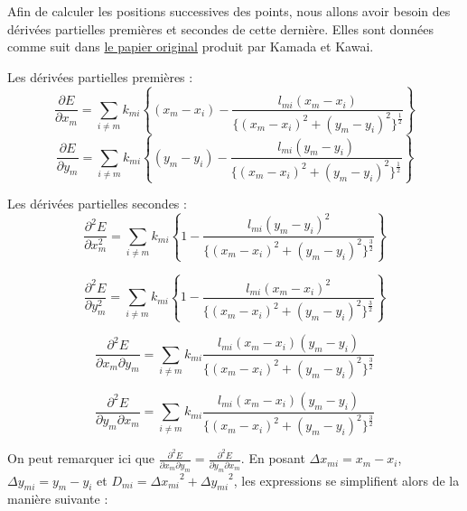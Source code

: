 \documentclass[a4paper,12pt]{article}
\begin{document}
Afin de calculer les positions successives des points, nous allons avoir besoin des dérivées partielles premières et secondes de cette dernière. Elles sont données comme suit dans \href{http://vis.pku.edu.cn/course/Visualization_2018F/reading/drawing_general_undirected.pdf}{le papier original} produit par Kamada et Kawai.

Les dérivées partielles premières :
\begin{equation}
\frac{\partial E}{\partial x_m} = \sum_{i \ne m} k_{mi} \left\{ (x_m - x_i) - \frac {l_{mi}(x_m - x_i)}{\{ (x_m - x_i)^2 + (y_m - y_i)^2 \}^{\frac{1}{2}}} \right\}
\end{equation}
\begin{equation}
\frac{\partial E}{\partial y_m} = \sum_{i \ne m} k_{mi} \left\{ (y_m - y_i) - \frac {l_{mi}(y_m - y_i)}{\{ (x_m - x_i)^2 + (y_m - y_i)^2 \}^{\frac{1}{2}}} \right\}
\end{equation}

Les dérivées partielles secondes :
\begin{equation}
\frac{\partial^2 E}{\partial x^2_m} = \sum_{i \ne m} k_{mi} \left\{ 1 - \frac {l_{mi}(y_m - y_i)^2}{\{ (x_m - x_i)^2 + (y_m - y_i)^2 \}^{\frac{3}{2}}} \right\}
\end{equation}

\begin{equation}
\frac{\partial^2 E}{\partial y^2_m} = \sum_{i \ne m} k_{mi} \left\{ 1 - \frac {l_{mi}(x_m - x_i)^2}{\{ (x_m - x_i)^2 + (y_m - y_i)^2 \}^{\frac{3}{2}}} \right\}
\end{equation}

\begin{equation}
\frac{\partial^2 E}{\partial x_m \partial y_m} = \sum_{i \ne m} k_{mi} \frac {l_{mi}(x_m - x_i)(y_m - y_i)}{\{ (x_m - x_i)^2 + (y_m - y_i)^2 \}^{\frac{3}{2}}}
\end{equation}

\begin{equation}
\frac{\partial^2 E}{\partial y_m \partial x_m} = \sum_{i \ne m} k_{mi} \frac {l_{mi}(x_m - x_i)(y_m - y_i)}{\{ (x_m - x_i)^2 + (y_m - y_i)^2 \}^{\frac{3}{2}}}
\end{equation}

On peut remarquer ici que $\frac{\partial^2 E}{\partial x_m \partial y_m} = \frac{\partial^2 E}{\partial y_m \partial x_m}$. En posant $\Delta x_{mi} = x_m - x_i$, $\Delta y_{mi} = y_m - y_i$ et $ D_{mi} = {\Delta x_{mi}}^2 + {\Delta y_{mi}}^2 $, les expressions se simplifient alors de la manière suivante :
\end{document}
